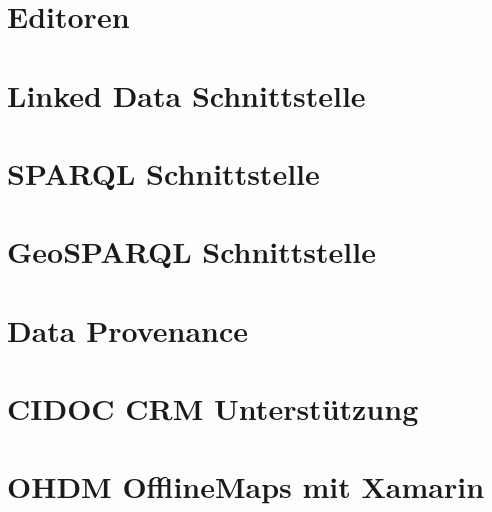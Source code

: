 \documentclass[german]{book}
\begin{document}
\chapter{Editoren}


\chapter{Linked Data Schnittstelle}


\chapter{SPARQL Schnittstelle}


\chapter{GeoSPARQL Schnittstelle}


\chapter{Data Provenance}


\chapter{CIDOC CRM Unterstützung}


\chapter{OHDM OfflineMaps mit Xamarin}

\end{document}
